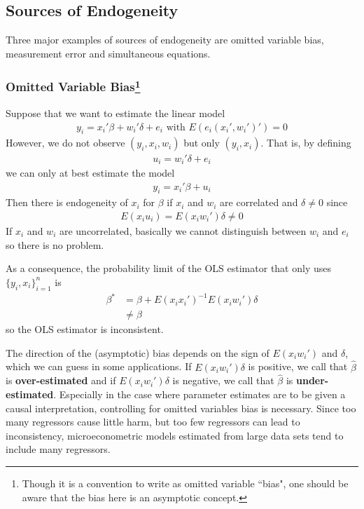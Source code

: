\documentclass[11pt]{article} %
\theoremstyle{definition}
\numberwithin{defn}{subsection}
\numberwithin{thm}{subsection}
\numberwithin{ex}{subsection}
\newcommand{\bhat}{\hat{\beta}}
\begin{document}
\subsection{Sources of Endogeneity}
Three major examples of sources of endogeneity are omitted variable bias, measurement error and simultaneous equations.

\subsubsection{Omitted Variable Bias\footnote{Though it is a convention to write as omitted variable ``bias", one should be aware that the bias here is an asymptotic concept.}}
Suppose that we want to estimate the linear model
\begin{align*}
y_i=x_i'\beta+w_i'\delta+e_i\text{ with }E(e_i(x_i',w_i')')=0
\end{align*}
However, we do not observe $(y_i,x_i,w_i)$ but only $(y_i,x_i)$. That is, by defining
\begin{align*}
u_i=w_i'\delta+e_i
\end{align*}
we can only at best estimate the model
\begin{align*}
y_i=x_i'\beta+u_i
\end{align*}
Then there is endogeneity of $x_i$ for $\beta$ if $x_i$ and $w_i$ are correlated and $\delta\neq0$ since
\begin{align*}
E(x_iu_i)=E(x_iw_i')\delta\neq0
\end{align*}
If $x_i$ and $w_i$ are uncorrelated, basically we cannot distinguish between $w_i$ and $e_i$ so there is no problem. 

As a consequence, the probability limit of the OLS estimator that only uses $\{y_i,x_i\}_{i=1}^n$ is 
\begin{align*}
\beta^*&=\beta+E(x_ix_i')^{-1}E(x_iw_i')\delta\\
&\neq \beta
\end{align*}
so the OLS estimator is inconsistent. 

The direction of the (asymptotic) bias depends on the sign of $E(x_iw_i')$ and $\delta$, which we can guess in some applications. If $E(x_iw_i')\delta$ is positive, we call that $\bhat$ is \textbf{over-estimated} and if $E(x_iw_i')\delta$ is negative, we call that $\bhat$ is \textbf{under-estimated}. 
Especially in the case where parameter estimates are to be given a causal interpretation, controlling for omitted variables bias is necessary. Since too many regressors cause little harm, but too few regressors can lead to inconsistency, microeconometric models estimated from large data sets tend to include many regressors.
\end{document}
